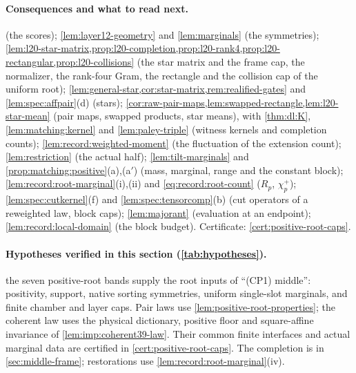 \paragraph{Consequences and what to read next.}
 (the scores); \cref{lem:layer12-geometry} and \cref{lem:marginals} (the
symmetries); \cref{lem:l20-star-matrix,prop:l20-completion,prop:l20-rank4,prop:l20-rectangular,prop:l20-collisions}
(the star matrix and the frame cap, the normalizer, the rank-four Gram, the rectangle and the
collision cap of the uniform root);
\cref{lem:general-star,cor:star-matrix,rem:realified-gates} and \cref{lem:spec:affpair}(d)
(stars); \cref{cor:raw-pair-maps,lem:swapped-rectangle,lem:l20-star-mean} (pair maps, swapped
products, star means), with \cref{thm:dl:K}, \cref{lem:matching:kernel} and
\cref{lem:paley-triple} (witness kernels and completion counts);
\cref{lem:record:weighted-moment} (the fluctuation of the extension count);
\cref{lem:restriction} (the actual half);
\cref{lem:tilt-marginals} and \cref{prop:matching:positive}(a),(a$'$) (mass, marginal, range and
the constant block); \cref{lem:record:root-marginal}(i),(ii) and
\eqref{eq:record:root-count} ($R_p$, $\chi^+_p$); \cref{lem:spec:cutkernel}(f) and
\cref{lem:spec:tensorcomp}(b) (cut operators of a reweighted law, block caps);
\cref{lem:majorant} (evaluation at an endpoint); \cref{lem:record:local-domain} (the block
budget). Certificate:
\cref{cert:positive-root-caps}.

\paragraph{Hypotheses verified in this section (\cref{tab:hypotheses}).} the seven positive-root bands
supply the root inputs of ``(CP1) middle'': positivity, support, native
sorting symmetries, uniform single-slot marginals, and finite chamber
and layer caps. Pair laws use \cref{lem:positive-root-properties};
the coherent law uses the physical dictionary, positive floor and
square-affine invariance of \cref{lem:imp:coherent39-law}. Their common finite interfaces
and actual marginal data are certified in \cref{cert:positive-root-caps}.
The completion is in \cref{sec:middle-frame}; restorations use
\cref{lem:record:root-marginal}(iv).
